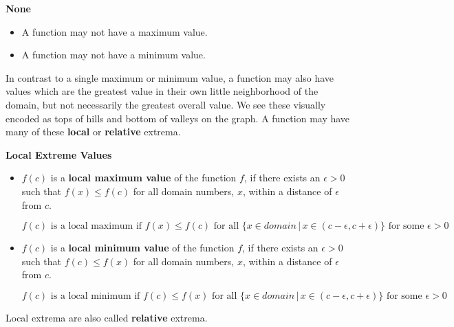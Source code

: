 \documentclass{ximera}
\begin{document}
\begin{warning} \textbf{\textcolor{red!70!black}{None}}

\begin{itemize}
\item A function may not have a maximum value. 
\item A function may not have a minimum value.
\end{itemize}

\end{warning}














In contrast to a single maximum or minimum value, a function may also have values which are the greatest value in their own little neighborhood of the domain, but not necessarily the greatest overall value.  We see these visually encoded as tops of hills and bottom of valleys on the graph.  A function may have many of these \textbf{local} or \textbf{relative} extrema.






\begin{definition} \textbf{\textcolor{green!50!black}{Local Extreme Values}} 
\begin{itemize}
\item $f(c)$ is a \textbf{local maximum value} of the function $f$, if there exists an $\epsilon > 0$ such that $f(x) \leq f(c)$ for all domain numbers, $x$, within a distance of $\epsilon$ from $c$. 

\[  f(c) \text{ is a local maximum if } f(x) \leq f(c) \text{ for all } \{ x \in domain \, | \, x \in (c - \epsilon, c + \epsilon) \} \text{ for some } \epsilon > 0 \]







\item $f(c)$ is a \textbf{local minimum value} of the function $f$, if there exists an $\epsilon > 0$ such that $f(c) \leq f(x)$ for all domain numbers, $x$, within a distance of $\epsilon$ from $c$. 



\[  f(c) \text{ is a local minimum if } f(c) \leq f(x) \text{ for all } \{ x \in domain \, | \, x \in (c - \epsilon, c + \epsilon) \} \text{ for some } \epsilon > 0 \]
\end{itemize}

Local extrema are also called \textbf{relative} extrema.

\end{definition}
\end{document}
